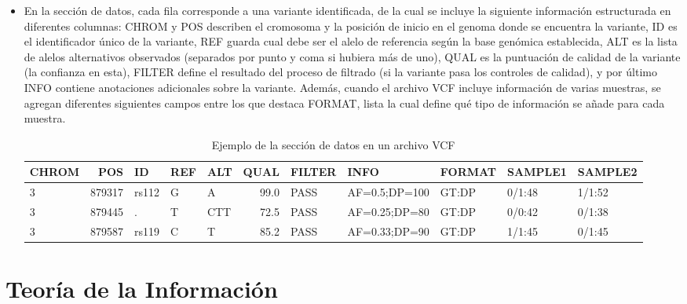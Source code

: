 \documentclass[11pt,spanish,listoffigures,listoftables]{tfgetsinf}
\begin{document}
\begin{itemize}
   \item En la sección de datos, cada fila corresponde a una variante identificada, de la cual se incluye la siguiente información estructurada en diferentes columnas: CHROM y POS describen el cromosoma y la posición de inicio en el genoma donde se encuentra la variante, ID es el identificador único de la variante, REF guarda cual debe ser el alelo de referencia según la base genómica establecida, ALT es la lista de alelos alternativos observados (separados por punto y coma si hubiera más de uno), QUAL es la puntuación de calidad de la variante (la confianza en esta), FILTER define el resultado del proceso de filtrado (si la variante pasa los controles de calidad), y por último INFO contiene anotaciones adicionales sobre la variante\cite{EMB}. Además, cuando el archivo \ac{VCF} incluye información de varias muestras, se agregan diferentes siguientes campos entre los que destaca FORMAT, lista la cual define qué tipo de información se añade para cada muestra. 
      \begin{table}[H]
         \centering
         \caption{Ejemplo de la sección de datos en un archivo VCF}
         \begin{adjustbox}{width=\textwidth}
         \begin{tabular}{|l|r|l|l|l|r|l|l|l|l|l|}
         \hline
         \textbf{CHROM} & \textbf{POS} & \textbf{ID} & \textbf{REF} & \textbf{ALT} & \textbf{QUAL} & \textbf{FILTER} & \textbf{INFO} & \textbf{FORMAT} & \textbf{SAMPLE1} & \textbf{SAMPLE2} \\
         \hline
         3 & 879317 & rs112 & G & A & 99.0 & PASS & AF=0.5;DP=100 & GT:DP & 0/1:48 & 1/1:52 \\
         3 & 879445 & . & T & CTT & 72.5 & PASS & AF=0.25;DP=80 & GT:DP & 0/0:42 & 0/1:38 \\
         3 & 879587 & rs119 & C & T & 85.2 & PASS & AF=0.33;DP=90 & GT:DP & 1/1:45 & 0/1:45 \\
         \hline
         \end{tabular}
         \end{adjustbox}
         \label{tabla:ejemploVCF}
      \end{table}
      
      
      
\end{itemize}



\section{Teoría de la Información}
\end{document}
